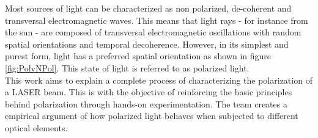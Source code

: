 \label{sec:INTRO}
Most sources of light can be characterized as non polarized, de-coherent and transversal electromagnetic waves. This means that light rays - for instance from the sun - are composed of transversal electromagnetic oscillations with random spatial orientations and temporal decoherence. However, in its simplest and purest form, light has a preferred spatial orientation as shown in figure \ref{fig:PolvNPol}. This state of light is referred to as polarized light.\\

This work aims to explain a complete process of characterizing the polarization of a LASER beam. This is with the objective of reinforcing the basic principles behind polarization through hands-on experimentation. The team creates a empirical argument of how polarized light behaves when subjected to different optical elements. 